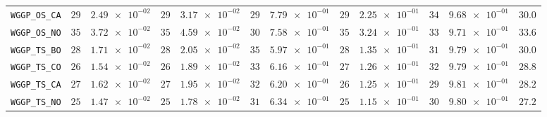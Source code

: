 \begin{table}[H]
\begin{tabularx}{\textwidth}{l||cC|cC|cC|cC|cC||c}
		\texttt{WGGP\_OS\_CA} & $ 29$ & $ \num{2.49e-02}$ & $ 29$ & $ \num{3.17e-02}$ & $ 29$ & $ \num{7.79e-01}$ & $ 29$ & $ \num{2.25e-01}$ & $ 34$ & $ \num{9.68e-01}$ & $ 30.0$  \\
		\texttt{WGGP\_OS\_NO} & $ 35$ & $ \num{3.72e-02}$ & $ 35$ & $ \num{4.59e-02}$ & $ 30$ & $ \num{7.58e-01}$ & $ 35$ & $ \num{3.24e-01}$ & $ 33$ & $ \num{9.71e-01}$ & $ 33.6$  \\
		\texttt{WGGP\_TS\_BO} & $ 28$ & $ \num{1.71e-02}$ & $ 28$ & $ \num{2.05e-02}$ & $ 35$ & $ \num{5.97e-01}$ & $ 28$ & $ \num{1.35e-01}$ & $ 31$ & $ \num{9.79e-01}$ & $ 30.0$  \\
		\texttt{WGGP\_TS\_CO} & $ 26$ & $ \num{1.54e-02}$ & $ 26$ & $ \num{1.89e-02}$ & $ 33$ & $ \num{6.16e-01}$ & $ 27$ & $ \num{1.26e-01}$ & $ 32$ & $ \num{9.79e-01}$ & $ 28.8$  \\
		\texttt{WGGP\_TS\_CA} & $ 27$ & $ \num{1.62e-02}$ & $ 27$ & $ \num{1.95e-02}$ & $ 32$ & $ \num{6.20e-01}$ & $ 26$ & $ \num{1.25e-01}$ & $ 29$ & $ \num{9.81e-01}$ & $ 28.2$  \\
		\texttt{WGGP\_TS\_NO} & $ 25$ & $ \num{1.47e-02}$ & $ 25$ & $ \num{1.78e-02}$ & $ 31$ & $ \num{6.34e-01}$ & $ 25$ & $ \num{1.15e-01}$ & $ 30$ & $ \num{9.80e-01}$ & $ 27.2$  \\
	\end{tabularx}
\end{table}
